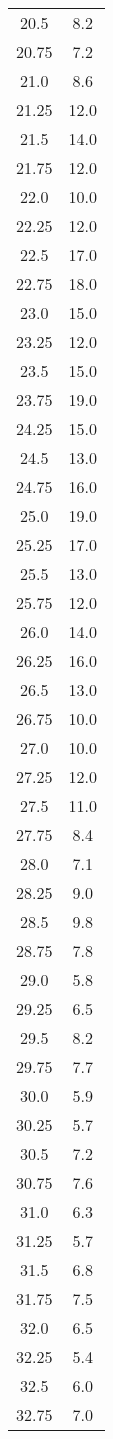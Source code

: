 \begin{table}
\begin{tabular}{S[]S[]}
20.5 & 8.2\\
20.75 & 7.2\\
21.0 & 8.6\\
21.25 & 12.0\\
21.5 & 14.0\\
21.75 & 12.0\\
22.0 & 10.0\\
22.25 & 12.0\\
22.5 & 17.0\\
22.75 & 18.0\\
23.0 & 15.0\\
23.25 & 12.0\\
23.5 & 15.0\\
23.75 & 19.0\\
24.25 & 15.0\\
24.5 & 13.0\\
24.75 & 16.0\\
25.0 & 19.0\\
25.25 & 17.0\\
25.5 & 13.0\\
25.75 & 12.0\\
26.0 & 14.0\\
26.25 & 16.0\\
26.5 & 13.0\\
26.75 & 10.0\\
27.0 & 10.0\\
27.25 & 12.0\\
27.5 & 11.0\\
27.75 & 8.4\\
28.0 & 7.1\\
28.25 & 9.0\\
28.5 & 9.8\\
28.75 & 7.8\\
29.0 & 5.8\\
29.25 & 6.5\\
29.5 & 8.2\\
29.75 & 7.7\\
30.0 & 5.9\\
30.25 & 5.7\\
30.5 & 7.2\\
30.75 & 7.6\\
31.0 & 6.3\\
31.25 & 5.7\\
31.5 & 6.8\\
31.75 & 7.5\\
32.0 & 6.5\\
32.25 & 5.4\\
32.5 & 6.0\\
32.75 & 7.0\\

\end{tabular}
\end{table}
